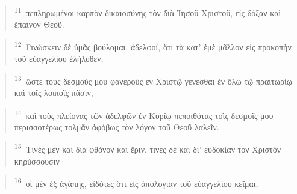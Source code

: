 \documentclass{article}
\newcommand{\currentverse}{1} %
\newcommand{\setcurrentverse}[1]{\renewcommand{\currentverse}{#1}}
\begin{document}
\begin{verse}

\setcurrentverse{11}

\setcounter{footnote}{0}

\textsuperscript{11}~πεπληρωμένοι καρπὸν δικαιοσύνης τὸν διὰ Ἰησοῦ Χριστοῦ, εἰς δόξαν καὶ ἔπαινον Θεοῦ.

\end{verse}

\begin{verse}

\setcurrentverse{12}

\setcounter{footnote}{0}

\textsuperscript{12}~Γινώσκειν δὲ ὑμᾶς βούλομαι, ἀδελφοί, ὅτι τὰ κατ’ ἐμὲ μᾶλλον εἰς προκοπὴν τοῦ εὐαγγελίου ἐλήλυθεν,

\end{verse}

\begin{verse}

\setcurrentverse{13}

\setcounter{footnote}{0}

\textsuperscript{13}~ὥστε τοὺς δεσμούς μου φανεροὺς ἐν Χριστῷ γενέσθαι ἐν ὅλῳ τῷ πραιτωρίῳ καὶ τοῖς λοιποῖς πᾶσιν,

\end{verse}

\begin{verse}

\setcurrentverse{14}

\setcounter{footnote}{0}

\textsuperscript{14}~καὶ τοὺς πλείονας τῶν ἀδελφῶν ἐν Κυρίῳ πεποιθότας τοῖς δεσμοῖς μου περισσοτέρως τολμᾶν ἀφόβως τὸν λόγον τοῦ Θεοῦ λαλεῖν.

\end{verse}

\begin{verse}

\setcurrentverse{15}

\setcounter{footnote}{0}

\textsuperscript{15}~Τινὲς μὲν καὶ διὰ φθόνον καὶ ἔριν, τινὲς δὲ καὶ δι’ εὐδοκίαν τὸν Χριστὸν κηρύσσουσιν·

\end{verse}

\begin{verse}

\setcurrentverse{16}

\setcounter{footnote}{0}

\textsuperscript{16}~οἱ μὲν ἐξ ἀγάπης, εἰδότες ὅτι εἰς ἀπολογίαν τοῦ εὐαγγελίου κεῖμαι,

\end{verse}
\end{document}
